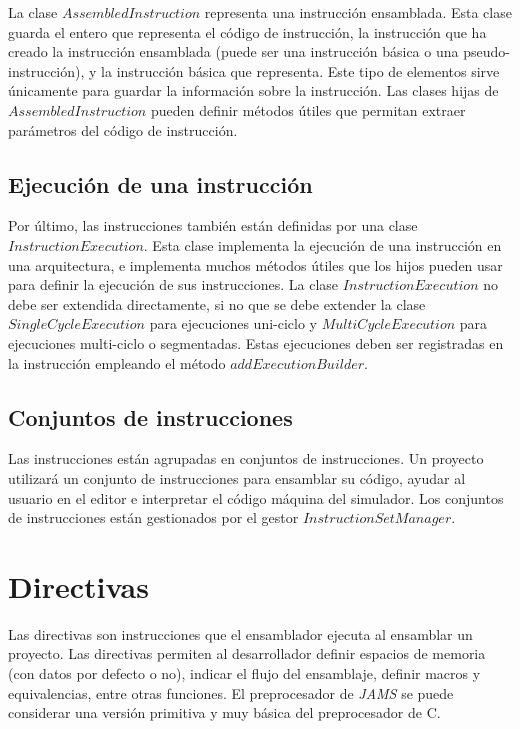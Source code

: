 La clase $AssembledInstruction$ representa una instrucción ensamblada.
Esta clase guarda el entero que representa el código de instrucción,
la instrucción que ha creado la instrucción ensamblada
(puede ser una instrucción básica o una pseudo-instrucción),
y la instrucción básica que representa.
Este tipo de elementos sirve únicamente para guardar
la información sobre la instrucción.
Las clases hijas de $AssembledInstruction$ pueden definir métodos útiles
que permitan extraer parámetros del código de instrucción.

\subsection{Ejecución de una instrucción}\label{subsec:ejecución-de-una-instruccion}

Por último, las instrucciones también están definidas por una clase
$InstructionExecution$.
Esta clase implementa la ejecución de una instrucción en una arquitectura,
e implementa muchos métodos útiles que los hijos pueden usar para definir
la ejecución de sus instrucciones.
La clase $InstructionExecution$ no debe ser extendida directamente,
si no que se debe extender la clase $SingleCycleExecution$
para ejecuciones uni-ciclo y $MultiCycleExecution$ para ejecuciones
multi-ciclo o segmentadas.
Estas ejecuciones deben ser registradas en la instrucción
empleando el método $addExecutionBuilder$.

\subsection{Conjuntos de instrucciones}\label{subsec:conjuntos-de-instrucciones}

Las instrucciones están agrupadas en conjuntos de instrucciones.
Un proyecto utilizará un conjunto de instrucciones para ensamblar su código,
ayudar al usuario en el editor e interpretar el código máquina del simulador.
Los conjuntos de instrucciones están gestionados por el gestor
$InstructionSetManager$.


\section{Directivas}\label{sec:directivas}

Las directivas son instrucciones que el ensamblador ejecuta al
ensamblar un proyecto.
Las directivas permiten al desarrollador definir espacios de memoria
(con datos por defecto o no), indicar el flujo del ensamblaje,
definir macros y equivalencias, entre otras funciones.
El preprocesador de \textit{JAMS} se puede considerar una versión primitiva
y muy básica del preprocesador de C\cite{C_PREPROCESSOR}.


